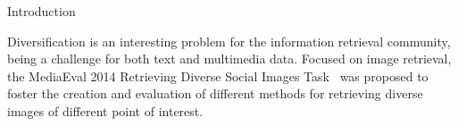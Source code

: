 
\begin{section}{Introduction}

Diversification is an interesting problem for the information retrieval community, 
being a challenge for both text and multimedia data.
Focused on image retrieval, the MediaEval 2014 Retrieving Diverse Social Images Task~\cite{overview14}
was proposed to foster the creation and evaluation of different methods for retrieving 
diverse images of different point of interest.



\end{section}



